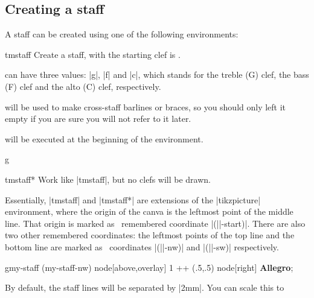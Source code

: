 \subsection{Creating a staff}\label{sec:init:staff-creation}
A staff can be created using one of the following environments:
\begin{environment}{{tmstaff}}
  Create a staff, with the starting clef is .

   can have three values: |g|, |f| and |c|, which stands for 
  the treble (G) clef, the bass (F) clef and the alto (C) clef, respectively.

   will be used to make cross-staff barlines or braces, so 
  you should only left it empty if you are sure you will not refer to it later.

   will be executed at the beginning of the environment.
\end{environment}
\begin{codeexample}[]
\begin{tmline}[staff offset=1cm]
\begin{tmstaff}{g}{}\end{tmstaff}
\end{tmline}
\end{codeexample}
\begin{environment}{{tmstaff*}}
  Work like |{tmstaff}|, but no clefs will be drawn.
\end{environment}
Essentially, |{tmstaff}| and |{tmstaff*}| are extensions of the 
|{tikzpicture}| environment, where the origin of the canva is the leftmost 
point of the middle line. That origin is marked as \tikzname\ remembered 
coordinate |(||-start)|. There are also two other remembered 
coordinates: the leftmost points of the top line and the bottom line are marked 
as \tikzname\ coordinates |(||-nw)| and |(||-sw)| 
respectively.
\begin{codeexample}[]
\begin{tmline}
\begin{tmstaff}{g}{my-staff}
  \path (my-staff-nw) node[above,overlay] {1} ++ (.5,.5) node[right] {\bfseries Allegro};
\end{tmstaff}
\end{tmline}
\end{codeexample}
By default, the staff lines will be separated by |2mm|. You can scale this to 
